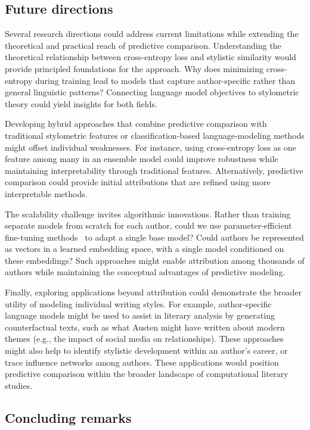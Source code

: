 \documentclass{llmxive}
\begin{document}
\subsection{Future directions}

Several research directions could address current limitations while extending
the theoretical and practical reach of predictive comparison. Understanding the
theoretical relationship between cross-entropy loss and stylistic similarity
would provide principled foundations for the approach. Why does minimizing
cross-entropy during training lead to models that capture author-specific
rather than general linguistic patterns? Connecting language model objectives
to stylometric theory could yield insights for both fields.

Developing hybrid approaches that combine predictive comparison with
traditional stylometric features or classification-based language-modeling
methods might offset individual weaknesses. For instance, using cross-entropy
loss as one feature among many in an ensemble model could improve robustness
while maintaining interpretability through traditional features. Alternatively,
predictive comparison could provide initial attributions that are refined using
more interpretable methods.

The scalability challenge invites algorithmic innovations. Rather than training
separate models from scratch for each author, could we use parameter-efficient
fine-tuning methods~\citep{HoulEtal19} to adapt a single base model? Could
authors be represented as vectors in a learned embedding space, with a single
model conditioned on these embeddings? Such approaches might enable attribution
among thousands of authors while maintaining the conceptual advantages of
predictive modeling.

Finally, exploring applications beyond attribution could demonstrate the
broader utility of modeling individual writing styles. For example,
author-specific language models might be used to assist in literary analysis by
generating counterfactual texts, such as what Austen might have written about
modern themes (e.g., the impact of social media on relationships). These
approaches might also help to identify stylistic development within an author's
career, or trace influence networks among authors. These applications would
position predictive comparison within the broader landscape of computational
literary studies.

\subsection{Concluding remarks}
\end{document}
